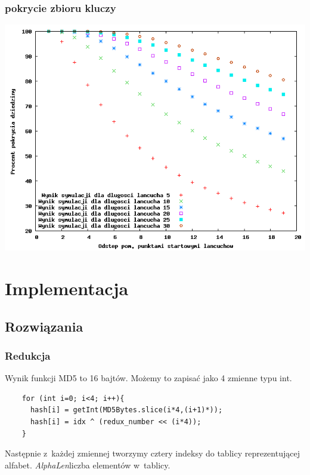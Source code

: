 \documentclass[a4paper]{scrartcl}
\begin{document}
\subsubsection{pokrycie zbioru kluczy}
\includegraphics[width=\textwidth]{pokrycie.png}

\section{Implementacja}
\subsection{Rozwiązania}

\subsubsection{Redukcja}
Wynik funkcji MD5 to 16 bajtów.
Możemy to zapisać jako 4 zmienne typu int.

\begin{lstlisting}
    for (int i=0; i<4; i++){
      hash[i] = getInt(MD5Bytes.slice(i*4,(i+1)*));
      hash[i] = idx ^ (redux_number << (i*4));
    }
\end{lstlisting}

Następnie z~każdej zmiennej tworzymy cztery indeksy do tablicy reprezentującej alfabet.
\newpage
\emph{AlphaLen}\dywiz liczba elementów w~tablicy.
\end{document}
